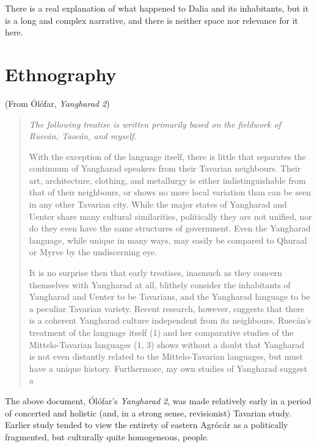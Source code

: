 \documentclass{article}
\begin{document}
There is a real explanation of what happened to Dalia and its inhabitants, but it is a long and complex narrative, and there is neither space nor relevance for it here.

\section*{Ethnography}

(From Ólófar, \textit{Yangharad 2})

\color{black}
\begin{quotation}

\textit{The following treatise is written primarily based on the fieldwork of Ruecán, Taocán, and myself.}

\hfill

With the exception of the language itself, there is little that separates the continuum of Yangharad speakers from their Tavarian neighbours. Their art, architecture, clothing, and metallurgy is either indistinguishable from that of their neighbours, or shows no more local variation than can be seen in any other Tavarian city. While the major states of Yangharad and Uenter share many cultural similarities, politically they are not unified, nor do they even have the same structures of government. Even the Yangharad language, while unique in many ways, may easily be compared to Qhuraal or Myrve by the undiscerning eye.

It is no surprise then that early treatises, inasmuch as they concern themselves with Yangharad at all, blithely consider the inhabitants of Yangharad and Uenter to be Tavarians, and the Yangharad language to be a peculiar Tavarian variety. Recent research, however, suggests that there is a coherent Yangharad culture independent from its neighbours. Ruecán's treatment of the language itself (1) and her comparative studies of the Mittelo-Tavarian languages (1, 3) shows without a doubt that Yangharad is not even distantly related to the Mittelo-Tavarian languages, but must have a unique history. Furthermore, my own studies of Yangharad suggest a

\end{quotation}

\color{DarkGreen}


The above document, Ólófar's \textit{Yangharad 2}, was made relatively early in a period of concerted and holistic (and, in a strong sense, revisionist) Tavarian study. Earlier study tended to view the entirety of eastern Agrócár as a politically fragmented, but culturally quite homogeneous, people.
\end{document}
